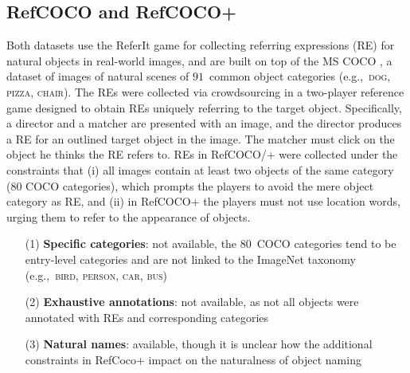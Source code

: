 \documentclass[runningheads]{llncs}
\newcommand{\referit}{ReferIt\xspace}
\newcommand{\refcoco}{RefCOCO\xspace}
\newcommand{\refcocop}{RefCOCO+\xspace}
\newcommand{\cat}[1]{\textsc{#1}}
\begin{document}

\subsection{\refcoco and \refcocop \cite{Yu2016}}
Both datasets use the \referit\cite{Kazemzadeh2014} game for collecting referring expressions (RE) for natural objects in real-world images, and are built on top of the MS COCO \cite{mscoco}, 
a dataset of images of natural scenes of $91$~common object categories (e.g.,~\cat{dog, pizza, chair}). 
The REs were collected via crowdsourcing in a two-player reference game designed to obtain REs uniquely referring to the target object. 
Specifically, a director and a matcher are presented with an image, and the director produces a RE for an outlined target object in the image. 
The matcher must click on the object he thinks the RE refers to. %
REs in \refcoco/+ were collected under the constraints that (i) all images contain at least two objects of the same category (80 COCO categories), which prompts the players to avoid the mere object category as RE, and (ii) in \refcocop the players must not use location words, urging them to refer to the appearance of objects. 

\begin{itemize}
     		\item[(1)] \textbf{Specific categories}: not available, the $80$~COCO categories tend to be entry-level categories and are not linked to the ImageNet taxonomy (e.g.,~\cat{bird, person, car, bus})
		\item[(2)] \textbf{Exhaustive annotations}: not available, as not all objects were annotated with REs and corresponding categories
		   \item[(3)] \textbf{Natural names}: available, though it is unclear how the additional constraints in RefCoco+ impact on the naturalness of object naming
\end{itemize}
\end{document}
